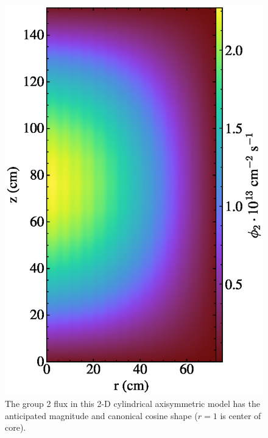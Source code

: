 \documentclass{article}
\begin{document}
\begin{figure}
  \centering
  \includegraphics{auto_diff_rho_group2.eps}
        \caption{The group 2 flux in this 2-D cylindrical axisymmetric model 
        has the anticipated magnitude and canonical cosine shape ($r=1$ is center of core). }
  \label{fig:group2}
\end{figure}
\end{document}
